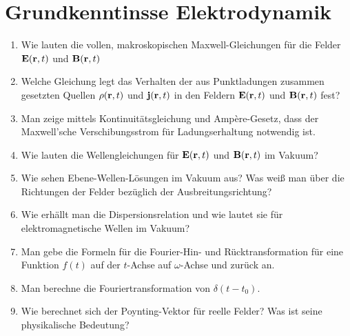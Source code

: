 \documentclass{scrartcl}
\begin{document}
  \section{Grundkenntinsse Elektrodynamik}
  \begin{enumerate}

    \item Wie lauten die vollen, makroskopischen Maxwell-Gleichungen für
          die Felder $\vb E(\vb r, t)$ und $\vb B(\vb r, t)$\\

    \item Welche Gleichung legt das Verhalten der aus Punktladungen
          zusammen gesetzten Quellen $\rho(\vb r, t)$ und 
          $\vb j(\vb r, t)$ in den Feldern $\vb E(\vb r, t)$
          und $\vb B(\vb r, t)$ fest?\\

    \item Man zeige mittels Kontinuitätsgleichung und Ampère-Gesetz, 
          dass der Maxwell'sche Verschibungsstrom für Ladungserhaltung
          notwendig ist.\\

    \item Wie lauten die Wellengleichungen für $\vb E(\vb r, t)$ und
          $\vb B(\vb r, t)$ im Vakuum?\\

    \item Wie sehen Ebene-Wellen-Lösungen im Vakuum aus? Was weiß man
          über die Richtungen der Felder bezüglich der 
          Ausbreitungsrichtung?\\

    \item Wie erhällt man die Dispersionsrelation und wie lautet sie für
          elektromagnetische Wellen im Vakuum?\\

    \item Man gebe die Formeln für die Fourier-Hin- und Rücktransformation
          für eine Funktion $f(t)$ auf der $t$-Achse auf $\omega$-Achse und
          zurück an.\\

    \item Man berechne die Fouriertransformation von $\delta(t-t_0)$.\\

    \item Wie berechnet sich der Poynting-Vektor für reelle Felder? Was
          ist seine physikalische Bedeutung?\\


\end{enumerate}
\end{document}
